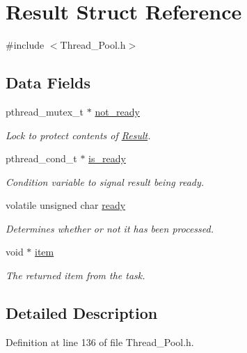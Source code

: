 \hypertarget{struct_result}{}\section{Result Struct Reference}
\label{struct_result}


{\ttfamily \#include $<$Thread\+\_\+\+Pool.\+h$>$}

\subsection*{Data Fields}
\begin{DoxyCompactItemize}
\item 
pthread\+\_\+mutex\+\_\+t $\ast$ \hyperlink{struct_result_a29a502fc8aca81df1310e7c10c3d99af}{not\+\_\+ready}
\begin{DoxyCompactList}\small\item\em Lock to protect contents of \textquotesingle{}\hyperlink{struct_result}{Result}\textquotesingle{}. \end{DoxyCompactList}\item 
pthread\+\_\+cond\+\_\+t $\ast$ \hyperlink{struct_result_a8f707934732f685f1b1b53a855de60d4}{is\+\_\+ready}
\begin{DoxyCompactList}\small\item\em Condition variable to signal result being ready. \end{DoxyCompactList}\item 
volatile unsigned char \hyperlink{struct_result_a7ad32217267e7e0144abffa4e782867c}{ready}
\begin{DoxyCompactList}\small\item\em Determines whether or not it has been processed. \end{DoxyCompactList}\item 
void $\ast$ \hyperlink{struct_result_aeeeae972d4d97226aa998aa9ca91346c}{item}
\begin{DoxyCompactList}\small\item\em The returned item from the task. \end{DoxyCompactList}\end{DoxyCompactItemize}


\subsection{Detailed Description}


Definition at line 136 of file Thread\+\_\+\+Pool.\+h.



